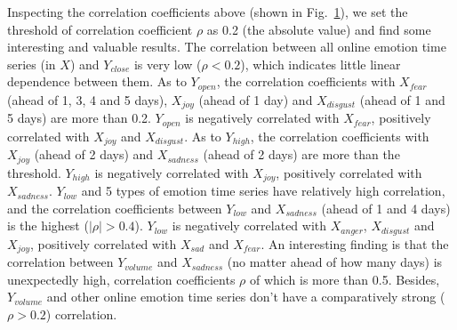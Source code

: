 \documentclass[aps,preprint,groupedaddress]{revtex4-1}
\begin{document}
Inspecting the correlation coefficients above (shown in Fig.~\ref{fig:error_bar}), we set the threshold of correlation coefficient $\rho$ as 0.2 (the absolute value) and find some interesting and valuable results. The correlation between all online emotion time series (in $X$) and $Y_{close}$ is very low ($\rho<0.2$), which indicates little linear dependence between them. As to $Y_{open}$, the correlation coefficients with $X_{fear}$ (ahead of 1, 3, 4 and 5 days), $X_{joy}$ (ahead of 1 day) and $X_{disgust}$ (ahead of 1 and 5 days) are more than 0.2. $Y_{open}$ is negatively correlated with $X_{fear}$, positively correlated with $X_{joy}$ and $X_{disgust}$. As to $Y_{high}$, the correlation coefficients with $X_{joy}$ (ahead of 2 days) and $X_{sadness}$ (ahead of 2 days) are more than the threshold. $Y_{high}$ is negatively correlated with $X_{joy}$, positively correlated with $X_{sadness}$. $Y_{low}$ and 5 types of emotion time series have relatively high correlation, and the correlation coefficients between $Y_{low}$ and $X_{sadness}$ (ahead of 1 and 4 days) is the highest ($|\rho|>0.4$). $Y_{low}$ is negatively correlated with $X_{anger}$, $X_{disgust}$ and $X_{joy}$, positively correlated with $X_{sad}$ and $X_{fear}$. An interesting finding is that the correlation between $Y_{volume}$ and $X_{sadness}$ (no matter ahead of how many days) is unexpectedly high, correlation coefficients $\rho$ of which is more than 0.5. Besides, $Y_{volume}$ and other online emotion time series don't have a comparatively strong ($\rho>0.2$) correlation. 

{}

\begin{figure}
\centering
{}
\hfil
{}
\hfil
{}
\hfil
{}
\hfil
{}
\caption{{\color{black}{Pearson correlation coefficient between five targets of stock market and online emotion time series.}}}
\label{fig:error_bar}
\end{figure}
\end{document}
